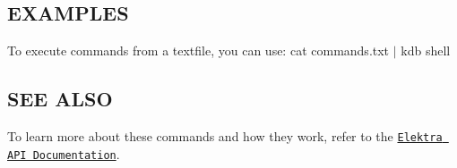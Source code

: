 \subsection*{E\+X\+A\+M\+P\+L\+E\+S}

To execute commands from a textfile, you can use\+: {\ttfamily cat commands.\+txt $\vert$ kdb shell}

\subsection*{S\+E\+E A\+L\+S\+O}

To learn more about these commands and how they work, refer to the \href{http://doc.libelektra.org/api/current/html}{\tt Elektra A\+P\+I Documentation}. 